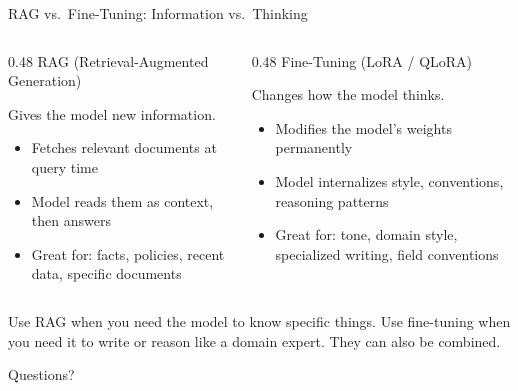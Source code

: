 \documentclass[aspectratio=169]{beamer}
\begin{document}
\begin{frame}{RAG vs.\ Fine-Tuning: Information vs.\ Thinking}
    \begin{columns}[T]
        \begin{column}{0.48\textwidth}
            RAG (Retrieval-Augmented Generation)

            \vspace{0.4em}
            Gives the model new information.

            \vspace{0.5em}
            \begin{itemize}
                \item Fetches relevant documents at query time
                \item Model reads them as context, then answers
                \item Great for: facts, policies, recent data, specific documents
            \end{itemize}
        \end{column}
        \begin{column}{0.48\textwidth}
            Fine-Tuning (LoRA / QLoRA)

            \vspace{0.4em}
            Changes how the model thinks.

            \vspace{0.5em}
            \begin{itemize}
                \item Modifies the model's weights permanently
                \item Model internalizes style, conventions, reasoning patterns
                \item Great for: tone, domain style, specialized writing, field conventions
            \end{itemize}
        \end{column}
    \end{columns}

    \vspace{1em}
    Use RAG when you need the model to know specific things. Use fine-tuning when you need it to write or reason like a domain expert. They can also be combined.
\end{frame}

\begin{frame}[plain]
    \vfill
    \begin{center}
        {\Large Questions?}
    \end{center}
    \vfill
\end{frame}
\end{document}
